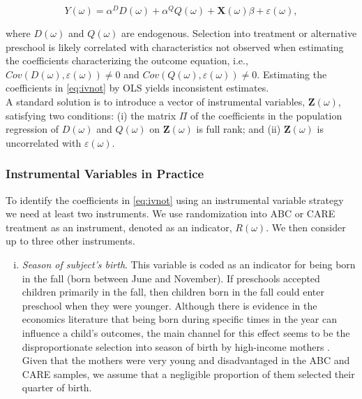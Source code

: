 \begin{appendices}
\begin{equation}
Y(\omega) = \alpha^D D(\omega) + \alpha^Q Q(\omega) + \mathbf{X}(\omega) \beta + \varepsilon(\omega),
\label{eq:ivnot}
\end{equation}

\noindent where $D(\omega)$ and $Q(\omega)$ are endogenous. Selection into treatment or alternative preschool is likely correlated with characteristics not observed when estimating the coefficients characterizing the outcome equation, i.e., $Cov(D(\omega),\varepsilon(\omega)) \neq 0$ and $Cov(Q(\omega),\varepsilon(\omega)) \neq 0$. Estimating the coefficients in \eqref{eq:ivnot} by OLS yields inconsistent estimates.\\

\noindent A standard solution is to introduce a vector of instrumental variables, $\mathbf{Z}(\omega)$, satisfying two conditions: (i) the matrix $\Pi$ of the coefficients in the population regression of $D(\omega)$ and $Q(\omega)$ on $\mathbf{Z}(\omega)$ is full rank; and (ii) $\mathbf{Z}(\omega)$ is uncorrelated with $\varepsilon(\omega)$.


\subsubsection{Instrumental Variables in Practice}

\noindent To identify the coefficients in \eqref{eq:ivnot} using an instrumental variable strategy we need at least two instruments. We use randomization into ABC or CARE treatment as an instrument, denoted as an indicator, $R(\omega)$. We then consider up to three other instruments.

\begin{enumerate}[(i)]
\item \textit{Season of subject's birth}. This variable is coded as an indicator for being born in the fall (born between June and November). If preschools accepted children primarily in the fall, then children born in the fall could enter preschool when they were younger. Although there is evidence in the economics literature that being born during specific times in the year can influence a child's outcomes, the main channel for this effect seems to be the disproportionate selection into season of birth by high-income mothers \citep{Buckles-Hungerman_2013_RES}. Given that the mothers were very young and disadvantaged in the ABC and CARE samples, we assume that a negligible proportion of them selected their quarter of birth.


\end{enumerate}
\end{appendices}
